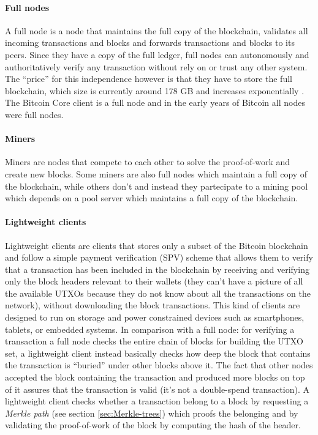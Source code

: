 \paragraph{Full nodes} A full node is a node that maintains the full copy of the
blockchain, validates all incoming transactions and blocks and forwards
transactions and blocks to its peers. Since they have a copy of the full ledger,
full nodes can autonomously and authoritatively verify any transaction without
rely on or trust any other system. The ``price'' for this independence however
is that they have to store the full blockchain, which size is currently around
178 GB and increases exponentially \cite{statista}. The Bitcoin Core client
is a full node and in the early years of Bitcoin all nodes were full nodes.

\paragraph{Miners} Miners are nodes that compete to each other to solve the
proof-of-work and create new blocks. Some miners are also full nodes which
maintain a full copy of the blockchain, while others don't and instead they
partecipate to a mining pool which depends on a pool server which maintains a
full copy of the blockchain.

\paragraph{Lightweight clients} Lightweight clients are clients that stores only
a subset of the Bitcoin blockchain and follow a simple payment verification
(SPV) scheme that allows them to verify that a transaction has been included in
the blockchain by receiving and verifying only the block headers relevant to
their wallets (they can't have a picture of all the available UTXOs because they
do not know about all the transactions on the network), without downloading the
block transactions. This kind of clients are designed to run on storage and
power constrained devices such as smartphones, tablets, or embedded systems. In
comparison with a full node: for verifying a transaction a full node checks the
entire chain of blocks for building the UTXO set, a lightweight client instead
basically checks how deep the block that contains the transaction is ``buried''
under other blocks above it. The fact that other nodes accepted the block
containing the transaction and produced more blocks on top of it assures that
the transaction is valid (it's not a double-spend transaction). A lightweight
client checks whether a transaction belong to a block by requesting a
\emph{Merkle path} (see section \ref{sec:Merkle-trees}) which proofs the
belonging and by validating the proof-of-work of the block by computing the hash
of the header.

